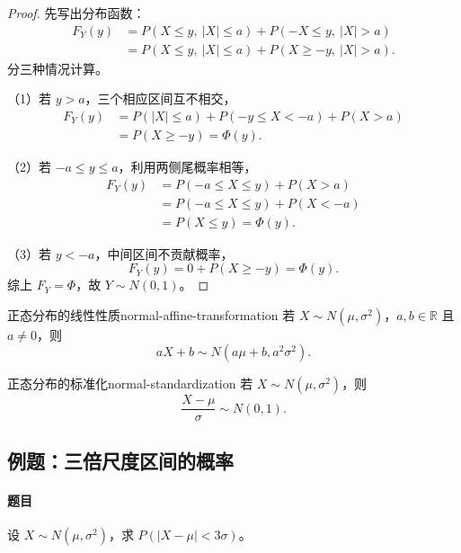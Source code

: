 \begin{proof}
先写出分布函数：
\[
\begin{aligned}
F_Y(y)
&=P(X\leq y,\ |X|\leq a)
+P(-X\leq y,\ |X|>a)\\
&=P(X\leq y,\ |X|\leq a)
+P(X\geq-y,\ |X|>a).
\end{aligned}
\]
分三种情况计算。

（1）若 $y>a$，三个相应区间互不相交，
\[
\begin{aligned}
F_Y(y)
&=P(|X|\leq a)+P(-y\leq X<-a)+P(X>a)\\
&=P(X\geq-y)=\Phi(y).
\end{aligned}
\]

（2）若 $-a\leq y\leq a$，利用两侧尾概率相等，
\[
\begin{aligned}
F_Y(y)
&=P(-a\leq X\leq y)+P(X>a)\\
&=P(-a\leq X\leq y)+P(X<-a)\\
&=P(X\leq y)=\Phi(y).
\end{aligned}
\]

（3）若 $y<-a$，中间区间不贡献概率，
\[
F_Y(y)=0+P(X\geq-y)=\Phi(y).
\]
综上 $F_Y=\Phi$，故 $Y\sim N(0,1)$。
\end{proof}

\begin{mytheorem}{正态分布的线性性质}{normal-affine-transformation}
若 $X\sim N(\mu,\sigma^2)$，$a,b\in\mathbb R$ 且 $a\ne0$，则
\[
aX+b\sim N(a\mu+b,a^2\sigma^2).
\]
\end{mytheorem}

\begin{mycorollary}{正态分布的标准化}{normal-standardization}
若 $X\sim N(\mu,\sigma^2)$，则
\[
\frac{X-\mu}{\sigma}\sim N(0,1).
\]
\end{mycorollary}

\subsection{例题：三倍尺度区间的概率}\label{note:c2:e18}
\paragraph{题目}
设 $X\sim N(\mu,\sigma^2)$，求 $P(|X-\mu|<3\sigma)$。

